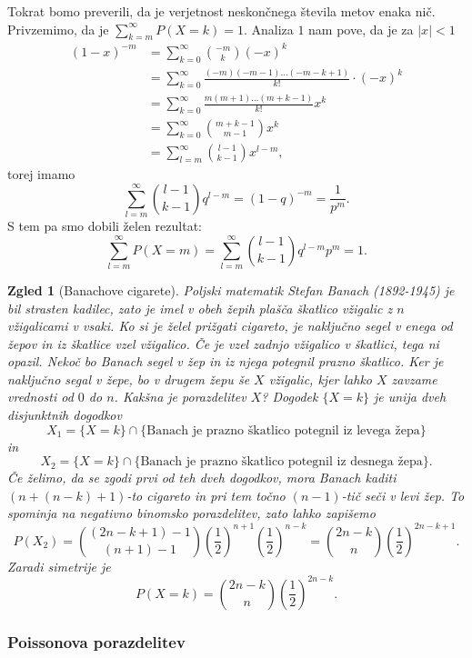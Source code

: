 \documentclass[10pt, a4paper]{article}
\newtheorem{zgled}[izr]{Zgled}
\begin{document}
Tokrat bomo preverili, da je verjetnost neskončnega števila metov enaka nič.
Privzemimo, da je $\sum_{k = m} ^\infty P(X = k) = 1$.
Analiza $1$ nam pove, da je za $|x| < 1$
\begin{align*}
  (1 - x)^{-m} &= \sum_{k = 0} ^\infty \binom{-m}{k} (-x)^k\\
  &= \sum_{k = 0} ^\infty \frac{(-m) (-m - 1) \dots (- m - k + 1)}{k!} \cdot (-x)^k\\
  &= \sum_{k = 0} ^\infty \frac{m (m + 1) \dots (m + k - 1)}{k!} x^k\\
  &= \sum_{k = 0} ^\infty \binom{m + k - 1}{m - 1} x^k\\
  &= \sum_{l = m} ^\infty \binom{l - 1}{k - 1} x^{l - m},
\end{align*}
torej imamo 
$$\sum_{l = m} ^\infty \binom{l - 1}{k - 1} q^{l - m}= (1 - q)^{-m} = \frac{1}{p^m}.$$
S tem pa smo dobili želen rezultat:
$$\sum_{l = m}^\infty P(X = m) = \sum_{l = m} ^\infty \binom{l - 1}{k - 1} q^{l - m} p^m = 1.$$

\begin{zgled}[Banachove cigarete]
  Poljski matematik Stefan Banach (1892-1945) je bil strasten kadilec,
  zato je imel v obeh žepih plašča škatlico vžigalic z $n$ vžigalicami v vsaki.
  Ko si je želel prižgati cigareto, je naključno segel v enega od žepov 
  in iz škatlice vzel vžigalico. Če je vzel zadnjo vžigalico v škatlici, tega ni opazil.
  Nekoč bo Banach segel v žep in iz njega potegnil prazno škatlico.
  Ker je naključno segal v žepe, bo v drugem žepu še $X$ vžigalic, 
  kjer lahko $X$ zavzame vrednosti od $0$ do $n$. Kakšna je porazdelitev $X$?
  Dogodek $\{X = k\}$ je unija dveh disjunktnih dogodkov 
  $$X_1 = \{X = k\} \cap \{\text{Banach je prazno škatlico potegnil iz levega žepa}\}$$
  in 
  $$X_2 = \{X = k\} \cap \{\text{Banach je prazno škatlico potegnil iz desnega žepa}\}.$$
  Če želimo, da se zgodi prvi od teh dveh dogodkov, mora Banach kaditi $(n + (n - k) + 1)$-to 
  cigareto in pri tem točno $(n - 1)$-tič seči v levi žep.
  To spominja na negativno binomsko porazdelitev, zato lahko zapišemo 
  $$P(X_2) = \binom{(2n - k + 1) - 1}{(n + 1) - 1} \left(\frac{1}{2}\right)^{n + 1} \left(\frac{1}{2}\right)^{n - k} = \binom{2n - k}{n} \left(\frac{1}{2}\right)^{2n - k + 1}.$$
  Zaradi simetrije je 
  $$P(X = k) = \binom{2n - k}{n} \left(\frac{1}{2}\right)^{2n - k}.$$
\end{zgled}

\subsubsection*{Poissonova porazdelitev}
\end{document}
